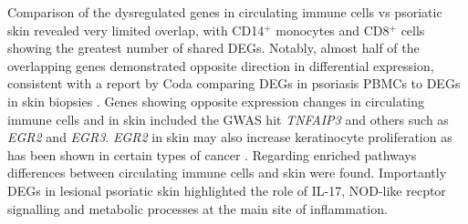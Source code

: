 Comparison of the dysregulated genes in circulating immune cells vs psoriatic skin revealed very limited overlap, with CD14$^+$ monocytes and CD8$^+$ cells showing the greatest number of shared DEGs.   %
Notably, almost half of the overlapping genes demonstrated opposite direction in differential expression, consistent with a report by Coda comparing DEGs in psoriasis PBMCs to DEGs in skin biopsies \parencite{Coda2012}. Genes showing opposite expression changes in circulating immune cells and in skin included the GWAS hit \textit{TNFAIP3} and others such as  \textit{EGR2} and \textit{EGR3}. %
\textit{EGR2} in skin may also increase keratinocyte proliferation as has been shown in certain types of cancer \parencite{Wu2010}. Regarding enriched pathways differences between circulating immune cells and skin were found. Importantly DEGs in lesional psoriatic skin highlighted the role of IL-17, NOD-like recptor signalling and metabolic processes at the main site of inflammation.






